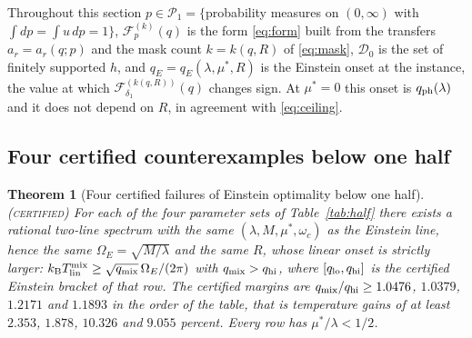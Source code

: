 \documentclass[11pt]{article}
\newcommand{\kb}{k_{\mathrm B}}
\newcommand{\Tlin}{T_{\mathrm{lin}}}
\newcommand{\OmE}{\Omega_E}
\newcommand{\Fcal}{\mathcal F}
\newcommand{\muS}{\mu^{*}}
\newtheorem{theorem}{Theorem}[section]
\theoremstyle{definition}
\theoremstyle{remark}
\newcommand{\certified}{\textnormal{\textsc{(certified)}}}
\begin{document}
Throughout this section $p\in\mathcal P_1=\{$probability measures on $(0,\infty)$ with
$\int dp=\int u\,dp=1\}$, $\Fcal_p^{(k)}(q)$ is the form \eqref{eq:form} built from the
transfers $a_r=a_r(q;p)$ and the mask count $k=k(q,R)$ of \eqref{eq:mask}, $\mathcal D_0$
is the set of finitely supported $h$, and $q_E=q_E(\lambda,\muS,R)$ is the Einstein onset
at the instance, the value at which $\Fcal_{\delta_1}^{(k(q,R))}(q)$ changes sign. At
$\muS=0$ this onset is $q_{\rm ph}(\lambda)$ and it does not depend on $R$, in agreement
with \eqref{eq:ceiling}.

\subsection{Four certified counterexamples below one half}\label{sec:half:cert}

\begin{theorem}[Four certified failures of Einstein optimality below one half]
\label{thm:half}\certified
For each of the four parameter sets of Table~\ref{tab:half} there exists a rational
two-line spectrum with the same $(\lambda,M,\muS,\omega_c)$ as the Einstein line, hence
the same $\OmE=\sqrt{M/\lambda}$ and the same $R$, whose linear onset is strictly larger:
$\kb\Tlin^{\rm mix}\ge\sqrt{q_{\rm mix}}\,\OmE/(2\pi)$ with $q_{\rm mix}>q_{\rm hi}$,
where $[q_{\rm lo},q_{\rm hi}]$ is the certified Einstein bracket of that row. The
certified margins are $q_{\rm mix}/q_{\rm hi}\ge1.0476$, $1.0379$, $1.2171$ and $1.1893$
in the order of the table, that is temperature gains of at least $2.353$, $1.878$,
$10.326$ and $9.055$ percent. Every row has $\muS/\lambda<1/2$.
\end{theorem}
\end{document}
